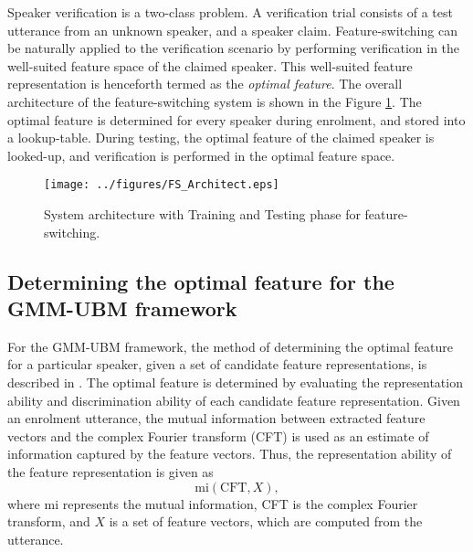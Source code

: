 \documentclass{article}
\begin{document}
Speaker verification is a two-class problem. A verification trial consists of a
test utterance from an unknown speaker, and a speaker claim. Feature-switching
can be naturally applied to the verification scenario by performing
verification in the well-suited feature space of the claimed speaker. This
well-suited feature representation is henceforth termed as the \emph{optimal
feature}. The overall architecture of the feature-switching system is shown in the
Figure \ref{fig:systemArch}. The optimal feature is determined for every speaker
during enrolment, and stored into a lookup-table. During testing, the optimal
feature of the claimed speaker is looked-up, and verification is performed in
the optimal feature space.

\begin{figure}[th]
\centering
\texttt{[image: ../figures/FS\_Architect.eps]}
\caption{System architecture with Training and Testing phase for feature-switching.}
\label{fig:systemArch}
\end{figure}



\subsection{Determining the optimal feature for the GMM-UBM framework}
\label{subsec:ubm_optFeat}

For the GMM-UBM framework, the method of determining the optimal feature for a
particular speaker, given a set of candidate feature representations, is
described in \cite{padmanInterspeech2010}. The optimal feature is determined by
evaluating the representation ability and discrimination ability
of each candidate feature representation. Given an enrolment utterance, the mutual information between extracted feature vectors and the complex Fourier transform (CFT) is used as an estimate of information captured by the feature vectors. Thus, the
representation ability of the feature representation is given as 
\begin{equation}
\textrm{mi}(\textrm{CFT},X),
\end{equation}
where $\textrm{mi}$ represents the mutual information, CFT is the complex
Fourier transform, and $X$ is a set of feature vectors, which are computed from
the utterance.
\end{document}
